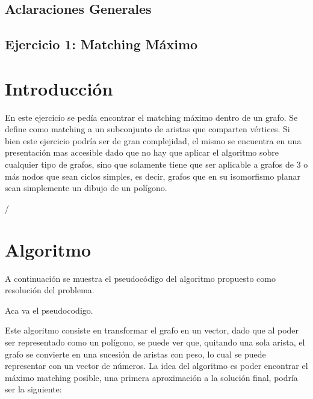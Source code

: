 \documentclass[a4paper, 12pt]{article}
\begin{document}
\begin{center}
\section*{Aclaraciones Generales}
\end{center}

\newpage
\begin{center}
\section*{Ejercicio 1: Matching M\'aximo}
\end{center}
 
\section*{Introducci\'on}
En este ejercicio se ped\'ia encontrar el matching m\'aximo dentro de un grafo. Se define como matching a un subconjunto de aristas que comparten v\'ertices. Si bien este ejercicio podr\'ia ser de gran complejidad, el mismo se encuentra en una presentaci\'on mas accesible dado que no hay que aplicar el algoritmo sobre cualquier tipo de grafos, sino que solamente tiene que ser aplicable a grafos de 3 o m\'as nodos que sean ciclos simples, es decir, grafos que en su isomorfismo planar sean simplemente un dibujo de un pol\'igono. 

/%

\section*{Algoritmo}
A continuaci\'on se muestra el pseudoc\'odigo del algoritmo propuesto como resoluci\'on del problema.


Aca va el pseudocodigo.


Este algoritmo consiste en transformar el grafo en un vector, dado que al poder ser representado como un pol\'igono, se puede ver que, quitando una sola arista, el grafo se convierte en una sucesi\'on de aristas con peso, lo cual se puede representar con un vector de n\'umeros. La idea del algoritmo es poder encontrar el m\'aximo matching posible, una primera aproximaci\'on a la soluci\'on final, podr\'ia ser la siguiente:
\end{document}
